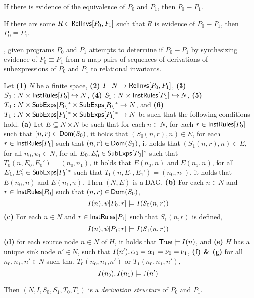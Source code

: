 If there is evidence of the equivalence of $P_0$ and $P_1$, then $P_0
\equiv P_1$.
%
\begin{lemma}
  \label{lemma:equiv-evidence}
  If there are some $R \in \mathsf{RelInvs}[ P_0, P_1 ]$ such that $R$ is
  evidence of $P_0 \equiv P_1$, then $P_0 \equiv P_1$.
\end{lemma}

\sys, given programs $P_0$ and $P_1$ attempts to determine if $P_0
\equiv P_1$ by synthesizing evidence of $P_0 \equiv P_1$ from a map
pairs of sequences of derivations of subexpressions of $P_0$ and $P_1$
to relational invariants.
%
\begin{defn}
  \label{defn:der-structs}
  Let \textbf{(1)} $N$ be a finite space, %
  \textbf{(2)} $I: N \to \mathsf{RelInvs}[ P_0, P_1 ]$,
  \textbf{(3)} $S_0 : N \times \mathsf{InstRules}[ P_0 ] \hookrightarrow N$, %
  \textbf{(4)} $S_1 : N \times \mathsf{InstRules}[ P_1 ] \hookrightarrow N$, %
  \textbf{(5)} $T_0 : N \times \mathsf{SubExps}[ P_0 ]^{*} \times
  \mathsf{SubExps}[ P_0 ]^{*} \to N$, and
  \textbf{(6)} $T_1 : N \times \mathsf{SubExps}[ P_1 ]^{*} \times
  \mathsf{SubExps}[ P_1 ]^{*} \to N$ be such that the following conditions
  hold.
  \textbf{(a)} Let $E \subseteq N \times N$ be such that for each $n
  \in N$, %
  for each $r \in \mathsf{InstRules}[ P_0 ]$ such that $(n, r) \in
  \mathsf{Dom}(S_0)$, it holds that $(S_0(n, r), n) \in E$, %
  for each $r \in \mathsf{InstRules}[ P_1 ]$ such that $(n, r) \in
  \mathsf{Dom}(S_1)$, it holds that $(S_1(n, r), n) \in E$, %
  for all $n_0, n_1 \in N$, %
  for all $E_0, E_0' \in \mathsf{SubExps}[ P_0 ]^{*}$ such that $T_0(n, E_0, E_0')
  = (n_0, n_1)$, it holds that $E(n_0, n)$ and $E(n_1, n)$, %
  for all $E_1, E_1' \in \mathsf{SubExps}[ P_1 ]^{*}$ such that $T_1(n, E_1,
  E_1') = (n_0, n_1)$, it holds that $E(n_0, n)$ and $E(n_1, n)$.
  Then $(N, E)$ is a DAG.
  \textbf{(b)} For each $n \in N$ and $r \in \mathsf{InstRules}[ P_0 ]$ such
  that $(n, r) \in \mathsf{Dom}(S_0)$,
  \[ I(n), \psi[  P_0  ;  r  ] \models I(S_0(n, r))
  \]
  \textbf{(c)} For each $n \in N$ and $r \in \mathsf{InstRules}[ P_1 ]$ such
  that $S_1(n, r)$ is defined,
  \[ I(n), \psi[  P_1  ;  r  ] \models I(S_1(n, r))
  \]
  \textbf{(d)} for each source node $n \in N$ of $H$, it holds that
  $\mathsf{True} \models I(n)$, and
  \textbf{(e)} $H$ has a unique sink node $n' \in N$, such that $I(n'),
  \alpha_0 = \alpha_1 \models \nu_0 = \nu_1$, %
  \textbf{(f) \& (g)} for all $n_0, n_1, n' \in N$ such that $T_0(n_0,
  n_1, n')$ or $T_1(n_0, n_1, n')$,
  \[ I(n_0), I(n_1) \models I(n')
  \]

  Then $(N, I, S_0, S_1, T_0, T_1)$ is a \emph{derivation structure}
  of $P_0$ and $P_1$.
\end{defn}

